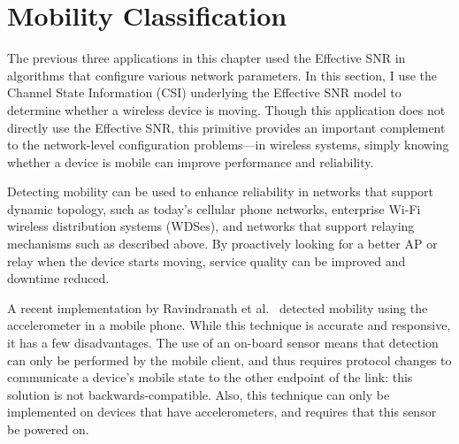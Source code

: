 \section{Mobility Classification}\label{sec:esnr_mobility}
The previous three applications in this chapter used the Effective SNR in algorithms that configure various network parameters. In this section, I use the Channel State Information (CSI) underlying the Effective SNR model to determine whether a wireless device is moving. Though this application does not directly use the Effective SNR, this primitive provides an important complement to the network-level configuration problems---in wireless systems, simply knowing whether a device is mobile can improve performance and reliability.

Detecting mobility can be used to enhance reliability in networks that support dynamic topology, such as today's cellular phone networks, enterprise Wi-Fi wireless distribution systems (WDSes), and networks that support relaying mechanisms such as described above. By proactively looking for a better AP or relay when the device starts moving, service quality can be improved and downtime reduced.

A recent implementation by Ravindranath et al.~\cite{Ravindranath_SensorHints} detected mobility using the accelerometer in a mobile phone. While this technique is accurate and responsive, it has a few disadvantages. The use of an on-board sensor means that detection can only be performed by the mobile client, and thus requires protocol changes to communicate a device's mobile state to the other endpoint of the link: this solution is not backwards-compatible. Also, this technique can only be implemented on devices that have accelerometers, and requires that this sensor be powered on.

